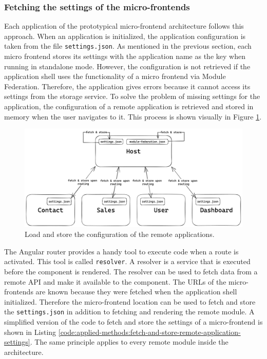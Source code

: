 \subsubsection{Fetching the settings of the micro-frontends}\label{subsubsection:applied-methods:prototypical-implementation
:load-the-configuration}

Each application of the prototypical micro-frontend architecture follows this approach. When an application is initialized, the application configuration is taken from the file \texttt{settings.json}. As mentioned in the previous section, each micro frontend stores its settings with the application name as the key when running in standalone mode. However, the configuration is not retrieved if the application shell uses the functionality of a micro frontend via Module Federation. Therefore, the application gives errors because it cannot access its settings from the storage service. To solve the problem of missing settings for the application, the configuration of a remote application is retrieved and stored in memory when the user navigates to it. This process is shown visually in Figure \ref{fig:applied-methods:load-remote-settings}.

\ifshowImages
  \begin{figure}[H]
  \centering
  \includegraphics[width=0.9\linewidth]{images/applied-methods/prototypical-implementation/load-remote-settings.png}
  \caption{Load and store the configuration of the remote applications.}\label{fig:applied-methods:load-remote-settings}
  \end{figure}
\fi

\noindent The Angular router provides a handy tool to execute code when a route is activated. This tool is called \texttt{resolver}. A resolver is a service that is executed before the component is rendered. The resolver can be used to fetch data from a remote \ac{API} and make it available to the component. \cite{misc:-:applied-methods:micro-frontends:angular-router-resolver} The \acp{URL} of the micro-frontends are known because they were fetched when the application shell initialized. Therefore the micro-frontend location can be used to fetch and store the \texttt{settings.json} in addition to fetching and rendering the remote module. A simplified version of the code to fetch and store the settings of a micro-frontend is shown in Listing \ref{code:applied-methods:fetch-and-store-remote-application-settings}. The same principle applies to every remote module inside the architecture.

